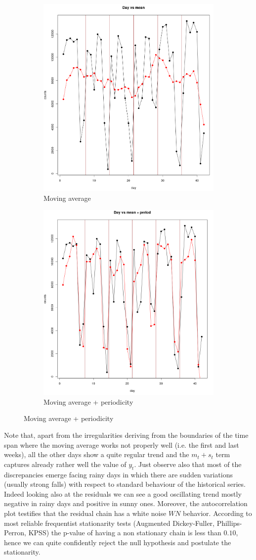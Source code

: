 \documentclass[11pt,twoside]{report}
\begin{document}
\begin{figure}[H]
	\begin{subfigure}[H]{0.5\linewidth}
		\centering
		\includegraphics[width=65 mm]{pictures/moving_average.png}
		\caption{Moving average}
		\label{fig:ma}
	\end{subfigure}
	\hfill
	\begin{subfigure}[H]{0.5\linewidth}
		\centering
		\includegraphics[width=65 mm]{pictures/period.png}
		\caption{Moving average + periodicity}
		\label{fig:period}
	\end{subfigure}
\end{figure}

Note that, apart from the irregularities deriving from the boundaries of the time span where the moving average works not properly well (i.e. the first and last weeks), all the other days show a quite regular trend and the $ m_t+s_t $ term captures already rather well the value of $ y_t $. Just observe also that most of the discrepancies emerge facing rainy days in which there are sudden variations (usually strong falls) with respect to standard behaviour of the historical series. Indeed looking also at the residuals we can see a good oscillating trend mostly negative in rainy days and positive in sunny ones. Moreover, the autocorrelation plot testifies that the residual chain has a white noise $ WN $ behavior. According to most reliable frequentist stationarity tests (Augmented Dickey-Fuller, Phillips-Perron, KPSS) the p-value of having a non stationary chain is less than $ 0.10 $, hence we can quite confidently reject the null hypothesis and postulate the stationarity.
\end{document}
